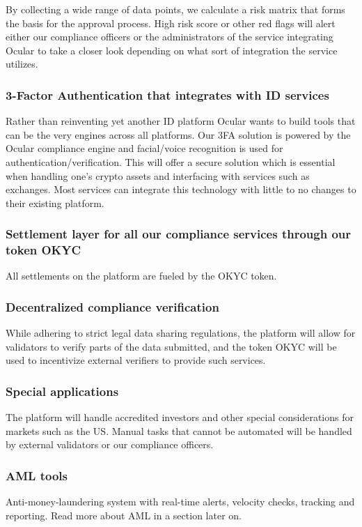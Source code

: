 \documentclass[a4paper]{article}
\begin{document}
By collecting a wide range of data points, we calculate a risk matrix that forms the basis for the approval process. High risk score or other red flags will alert either our compliance officers or the administrators of the service integrating Ocular to take a closer look depending on what sort of integration the service utilizes. 


\subsubsection*{3-Factor Authentication that integrates with ID services}
Rather than reinventing yet another ID platform Ocular wants to build tools that can be the very engines across all platforms. Our 3FA solution is powered by the Ocular compliance engine and facial/voice recognition is used for authentication/verification. This will offer a secure solution which is essential when handling one's crypto assets and interfacing with services such as exchanges. Most services can integrate this technology with little to no changes to their existing platform. 


\subsubsection*{Settlement layer for all our compliance services through our token OKYC}
All settlements on the platform are fueled by the OKYC token. 

\subsubsection*{Decentralized compliance verification}

While adhering to strict legal data sharing regulations, the platform will allow for validators to verify parts of the data submitted, and the token OKYC will be used to incentivize external verifiers to provide such services.

\subsubsection*{Special applications}
The platform will handle accredited investors and other special considerations for markets such as the US. Manual tasks that cannot be automated will be handled by external validators or our compliance officers. 

\subsubsection*{AML tools}
Anti-money-laundering system with real-time alerts, velocity checks, tracking and reporting. Read more about AML in a section later on.
\end{document}

